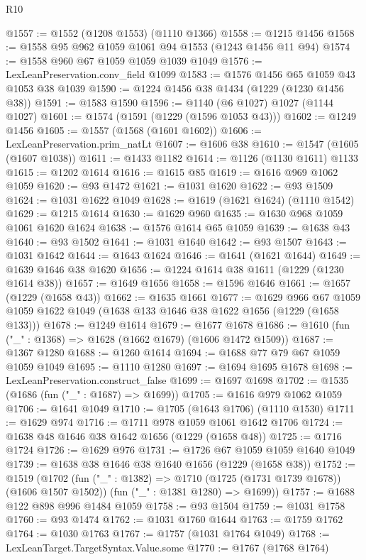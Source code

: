 \begin{lexlean}{R10}
\begin{coremodule}
@1557 := @1552 (@1208 @1553) (@1110 @1366)
@1558 := @1215 @1456
@1568 := @1558 @95 @962 @1059 @1061 @94 @1553 (@1243 @1456 @11 @94)
@1574 := @1558 @960 @67 @1059 @1059 @1039 @1049
@1576 := LexLeanPreservation.conv_field @1099
@1583 := @1576 @1456 @65 @1059 @43 @1053 @38 @1039
@1590 := @1224 @1456 @38 @1434 (@1229 (@1230 @1456 @38))
@1591 := @1583 @1590
@1596 := @1140 (@6 @1027) @1027 (@1144 @1027)
@1601 := @1574 (@1591 (@1229 (@1596 @1053 @43)))
@1602 := @1249 @1456
@1605 := @1557 (@1568 (@1601 @1602))
@1606 := LexLeanPreservation.prim_natLt
@1607 := @1606 @38
@1610 := @1547 (@1605 (@1607 @1038))
@1611 := @1433 @1182
@1614 := @1126 (@1130 @1611) @1133
@1615 := @1202 @1614
@1616 := @1615 @85
@1619 := @1616 @969 @1062 @1059
@1620 := @93 @1472
@1621 := @1031 @1620
@1622 := @93 @1509
@1624 := @1031 @1622 @1049
@1628 := @1619 (@1621 @1624) (@1110 @1542)
@1629 := @1215 @1614
@1630 := @1629 @960
@1635 := @1630 @968 @1059 @1061 @1620 @1624
@1638 := @1576 @1614 @65 @1059
@1639 := @1638 @43
@1640 := @93 @1502
@1641 := @1031 @1640
@1642 := @93 @1507
@1643 := @1031 @1642
@1644 := @1643 @1624
@1646 := @1641 (@1621 @1644)
@1649 := @1639 @1646 @38 @1620
@1656 := @1224 @1614 @38 @1611 (@1229 (@1230 @1614 @38))
@1657 := @1649 @1656
@1658 := @1596 @1646
@1661 := @1657 (@1229 (@1658 @43))
@1662 := @1635 @1661
@1677 := @1629
    @966
    @67
    @1059
    @1059
    @1622
    @1049
    (@1638 @133 @1646 @38 @1622 @1656 (@1229 (@1658 @133)))
@1678 := @1249 @1614
@1679 := @1677 @1678
@1686 := @1610 (fun ("_" : @1368) => @1628 (@1662 @1679) (@1606 @1472 @1509))
@1687 := @1367 @1280
@1688 := @1260 @1614
@1694 := @1688 @77 @79 @67 @1059 @1059 @1049
@1695 := @1110 @1280
@1697 := @1694 @1695 @1678
@1698 := LexLeanPreservation.construct_false
@1699 := @1697 @1698
@1702 := @1535 (@1686 (fun ("_" : @1687) => @1699))
@1705 := @1616 @979 @1062 @1059
@1706 := @1641 @1049
@1710 := @1705 (@1643 @1706) (@1110 @1530)
@1711 := @1629 @974
@1716 := @1711 @978 @1059 @1061 @1642 @1706
@1724 := @1638 @48 @1646 @38 @1642 @1656 (@1229 (@1658 @48))
@1725 := @1716 @1724
@1726 := @1629 @976
@1731 := @1726 @67 @1059 @1059 @1640 @1049
@1739 := @1638 @38 @1646 @38 @1640 @1656 (@1229 (@1658 @38))
@1752 := @1519
    (@1702
      (fun ("_" : @1382) => @1710 (@1725 (@1731 @1739 @1678)) (@1606 @1507 @1502))
      (fun ("_" : @1381 @1280) => @1699))
@1757 := @1688 @122 @898 @996 @1484 @1059
@1758 := @93 @1504
@1759 := @1031 @1758
@1760 := @93 @1474
@1762 := @1031 @1760 @1644
@1763 := @1759 @1762
@1764 := @1030 @1763
@1767 := @1757 (@1031 @1764 @1049)
@1768 := LexLeanTarget.TargetSyntax.Value.some
@1770 := @1767 (@1768 @1764)

\end{coremodule}
\end{lexlean}
